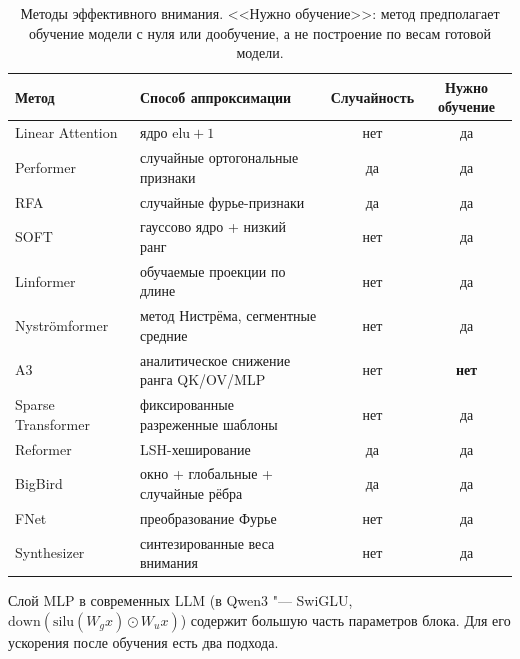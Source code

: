 \begin{table}[h]
\centering
\small
\begin{tabularx}{\textwidth}{@{}l X c c@{}}
\toprule
Метод & Способ аппроксимации & Случайность & Нужно обучение \\
\midrule
Linear Attention~\cite{katharopoulos2020rnn} & ядро $\mathrm{elu}+1$ & нет & да \\
Performer~\cite{choromanski2021performer} & случайные ортогональные признаки & да & да \\
RFA~\cite{peng2021rfa} & случайные фурье-признаки & да & да \\
SOFT~\cite{lu2021soft} & гауссово ядро + низкий ранг & нет & да \\
Linformer~\cite{wang2020linformer} & обучаемые проекции по длине & нет & да \\
Nyströmformer~\cite{xiong2021nystrom} & метод Нистрёма, сегментные средние & нет & да \\
A3~\cite{wong2025a3} & аналитическое снижение ранга QK/OV/MLP & нет & \textbf{нет} \\
Sparse Transformer~\cite{child2019sparse} & фиксированные разреженные шаблоны & нет & да \\
Reformer~\cite{kitaev2020reformer} & LSH-хеширование & да & да \\
BigBird~\cite{zaheer2020bigbird} & окно + глобальные + случайные рёбра & да & да \\
FNet~\cite{leethorp2022fnet} & преобразование Фурье & нет & да \\
Synthesizer~\cite{tay2021synthesizer} & синтезированные веса внимания & нет & да \\
\bottomrule
\end{tabularx}
\caption{Методы эффективного внимания. <<Нужно обучение>>: метод
предполагает обучение модели с нуля или дообучение, а не
построение по весам готовой модели.}
\end{table}

\label{sec:mlp}

Слой MLP в современных LLM (в Qwen3 "--- SwiGLU,
$\mathrm{down}(\mathrm{silu}(W_g x)\odot W_u x)$) содержит большую часть
параметров блока. Для его ускорения после обучения есть два подхода.

